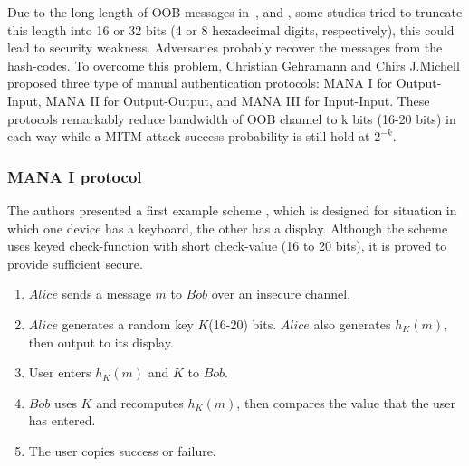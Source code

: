 Due to the long length of OOB messages in~\cite{1624021}, and \cite{Smetters02talkingto}, some studies tried to truncate this length into 16 or 32 bits (4 or 8 hexadecimal digits, respectively), this could lead to security weakness. Adversaries probably recover the messages from the hash-codes. To overcome this problem, Christian Gehramann and Chirs J.Michell \cite{Mitchell:2004p25948} proposed three type of manual authentication protocols: MANA I for Output-Input, MANA II for Output-Output, and MANA III for Input-Input. These protocols remarkably reduce bandwidth of OOB channel to k bits (16-20 bits) in each way while a MITM attack success probability is still hold at $2^{-k}$. 

\subsubsection*{MANA I protocol}

The authors presented a first example scheme \cite{Mitchell:2004p25948}, which is designed for situation in which one device has a keyboard, the other has a display. Although the scheme uses keyed check-function with short check-value (16 to 20 bits), it is proved to provide sufficient secure. 

\begin{enumerate}
\item $Alice$ sends a message $m$ to $Bob$ over an insecure channel. 
\item $Alice$ generates a random key $K$(16-20) bits. $Alice$ also generates $h_K(m)$, then output to its display.
\item User enters $h_K(m)$ and $K$ to $Bob$.
\item $Bob$ uses $K$ and recomputes $h_K(m)$, then compares the value that the user has entered.
\item The user copies success or failure. 
\end{enumerate}

\begin{center}
\end{center}

